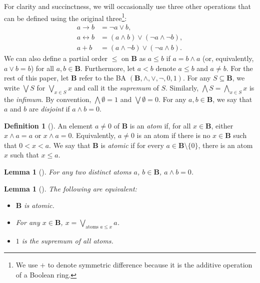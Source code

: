 \documentclass{article}
\newtheorem{lemma}[theorem]{Lemma}
\theoremstyle{definition}
\newtheorem{definition}[theorem]{Definition}
\theoremstyle{remark}
\begin{document}
For clarity and succinctness, we will occasionally use three other operations
that can be defined using the original three\footnote{We use $+$ to denote
  symmetric difference because it is the additive operation of a Boolean ring.}:
\begin{align*}
  a \to b &= \neg a \lor b, \\
  a \leftrightarrow b &= (a \land b) \lor (\neg a \land \neg b), \\
  a + b &= (a \land \neg b) \lor (\neg a \land b).
\end{align*}
We can also define a partial order $\le$ on $\mathbf{B}$ as $a \le b$ if $a = b
\land a$ (or, equivalently, $a \lor b = b$) for all $a, b \in \mathbf{B}$.
Furthermore, let $a < b$ denote $a \le b$ and $a \ne b$. For the rest of this
paper, let $\mathbf{B}$ refer to the BA $(\mathbf{B}, \land, \lor, \neg, 0, 1)$.
For any $S \subseteq \mathbf{B}$, we write $\bigvee S$ for $\bigvee_{x \in S} x$
and call it the \emph{supremum} of $S$. Similarly, $\bigwedge S = \bigwedge_{x
  \in S} x$ is the \emph{infimum}. By convention, $\bigwedge \emptyset = 1$ and
$\bigvee \emptyset = 0$. For any $a, b \in \mathbf{B}$, we say that $a$ and $b$
are \emph{disjoint} if $a \land b = 0$.

\begin{definition}[\cite{DBLP:books/daglib/0090259,levasseur2012applied}]
  An element $a \ne 0$ of $\mathbf{B}$ is an \emph{atom} if, for all $x \in
  \mathbf{B}$, either $x \land a = a$ or $x \land a = 0$. Equivalently, $a \ne
  0$ is an atom if there is no $x \in \mathbf{B}$ such that $0 < x < a$. We say
  that $\mathbf{B}$ is \emph{atomic} if for every $a \in \mathbf{B} \setminus \{0
  \}$, there is an atom $x$ such that $x \le a$.
\end{definition}

\begin{lemma}[\cite{ganesh2006introduction}]
  For any two distinct atoms $a$, $b \in \mathbf{B}$, $a \land b = 0$.
\end{lemma}

\begin{lemma}[\cite{givant2008introduction}] \label{thm:representation}
  The following are equivalent:
  \begin{itemize}
  \item $\mathbf{B}$ is atomic.
  \item For any $x \in \mathbf{B}$, $x = \bigvee_{\text{atoms } a \le x} a$.
  \item $1$ is the supremum of all atoms.
  \end{itemize}
\end{lemma}
\end{document}
